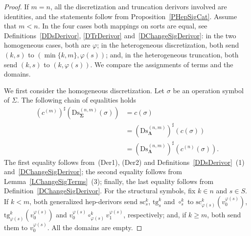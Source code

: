 \documentclass[a4paper, reqno]{amsbook}
\newcommand{\sig}[1]{\mathbf{#1}}             %
\newcommand{\src}{\mathrm{sc}}
\newcommand{\tgt}{\mathrm{tg}}
\newcommand{\Ds}{\mathrm{Ds}}
\theoremstyle{plain}
\theoremstyle{definition}
\begin{document}
\begin{proof}
If $m=n$, all the discretization and truncation derivors involved are identities, and the statements follow from Proposition~\ref{PHepSigCat}.
Assume that $m<n$.
In the four cases both mappings on sorts are equal, see Definitions~\ref{DDsDerivor}, \ref{DTrDerivor} and~\ref{DChangeSigDerivor}: in the two homogeneous cases, both are $\varphi$; in the heterogeneous discretization, both send $(k,s)$ to $(\min\{k,m\},\varphi(s))$; and, in the heterogeneous truncation, both send $(k,s)$ to $(k,\varphi(s))$.
We compare the assignments of terms and the domains.

We first consider the homogeneous discretization.
Let $\sigma$ be an operation symbol of $\Sigma$.
The following chain of equalities holds
\begin{align*}
(c^{(m)})^{\sharp}\left(\Ds^{(n,m)}_{\sig{\Sigma}}(\sigma)\right)
&=
c(\sigma)
\tag{1}
\\&=
(\Ds^{(n,m)}_{\sig{\Lambda}})^{\sharp}\left(c(\sigma)\right)
\tag{2}
\\&=
(\Ds^{(n,m)}_{\sig{\Lambda}})^{\sharp}\left(c^{(n)}(\sigma)\right).
\tag{3}
\end{align*}
The first equality follows from~(Der1), (Der2) and Definitions~\ref{DDsDerivor}~(1) and~\ref{DChangeSigDerivor}; the second equality follows from Lemma~\ref{LChangeSigTerms}~(3); finally, the last equality follows from Definition~\ref{DChangeSigDerivor}.
For the structural symbols, fix $k\in n$ and $s\in S$.
If $k<m$, both generalized hep-derivors send $\src^{k}_{s}$, $\tgt^{k}_{s}$ and $\circ^{k}_{s}$ to $\src^{k}_{\varphi(s)}(v^{\varphi(s)}_{0})$, $\tgt^{k}_{\varphi(s)}(v^{\varphi(s)}_{0})$ and $v^{\varphi(s)}_{0}\circ^{k}_{\varphi(s)}v^{\varphi(s)}_{1}$, respectively; and, if $k\geq m$, both send them to $v^{\varphi(s)}_{0}$.
All the domains are empty.


\end{proof}
\end{document}
